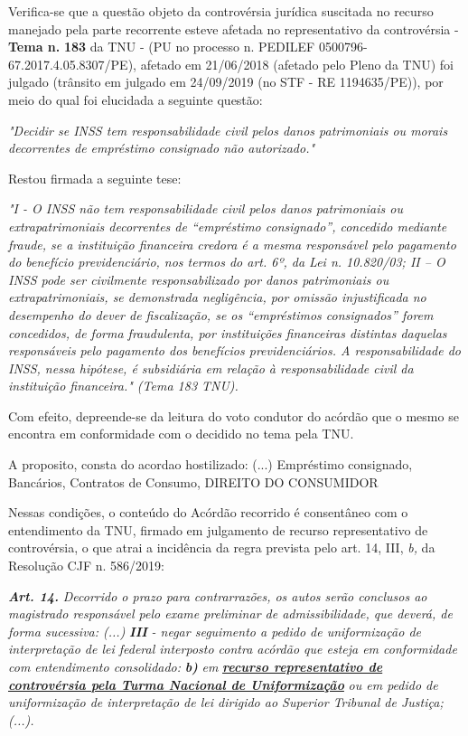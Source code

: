 \documentclass[12pt]{article}
\begin{document}
\justifying
\noindent Verifica-se que a questão objeto da controvérsia jurídica suscitada no recurso manejado pela parte recorrente esteve afetada no representativo da controvérsia - \textbf{Tema n. }\textbf{183} da TNU - (PU no processo n. PEDILEF 0500796-67.2017.4.05.8307/PE),  afetado em 21/06/2018 (afetado pelo Pleno da TNU) foi julgado (trânsito em julgado em 24/09/2019 (no STF - RE 1194635/PE)), por meio do qual foi elucidada a seguinte questão:

\noindent \textit{"Decidir se INSS tem responsabilidade civil pelos danos patrimoniais ou morais decorrentes de empréstimo consignado não autorizado."}

\noindent Restou firmada a seguinte tese:

\noindent \textit{"I - O INSS não tem responsabilidade civil pelos danos patrimoniais ou extrapatrimoniais decorrentes de “empréstimo consignado”, concedido mediante fraude, se a instituição financeira credora é a mesma responsável pelo pagamento do benefício previdenciário, nos termos do art. 6º, da Lei n. 10.820/03; II – O INSS pode ser civilmente responsabilizado por danos patrimoniais ou extrapatrimoniais, se demonstrada negligência, por omissão injustificada no desempenho do dever de fiscalização, se os “empréstimos consignados” forem concedidos, de forma fraudulenta, por instituições financeiras distintas daquelas responsáveis pelo pagamento dos benefícios previdenciários. A responsabilidade do INSS, nessa hipótese, é subsidiária em relação à responsabilidade civil da instituição financeira." (Tema 183 TNU).}

\noindent Com efeito, depreende-se da leitura do voto condutor do acórdão que o mesmo se encontra em conformidade com o decidido no  tema pela TNU.

\noindent A proposito, consta do acordao hostilizado: (...) Empréstimo consignado, Bancários, Contratos de Consumo, DIREITO DO CONSUMIDOR

\noindent Nessas condições, o conteúdo do Acórdão recorrido é consentâneo com o entendimento da TNU, firmado em julgamento de recurso representativo de controvérsia, o que atrai a incidência da regra prevista pelo art. 14, III, \textit{b,} da Resolução CJF n. 586/2019:

\noindent \textit{\textbf{Art. 14.}}\textit{ Decorrido o prazo para contrarrazões, os autos serão conclusos ao magistrado responsável pelo exame preliminar de admissibilidade, que deverá, de forma sucessiva: (...) }\textit{\textbf{III }}\textit{- negar seguimento a pedido de uniformização de interpretação de lei federal interposto contra acórdão que esteja em conformidade com entendimento consolidado: }\textit{\textbf{b)}}\textit{ em }\uline{\textit{\textbf{recurso representativo de controvérsia pela Turma Nacional de Uniformização}}}\textit{ ou em pedido de uniformização de interpretação de lei dirigido ao Superior Tribunal de Justiça;(...).}
\end{document}
